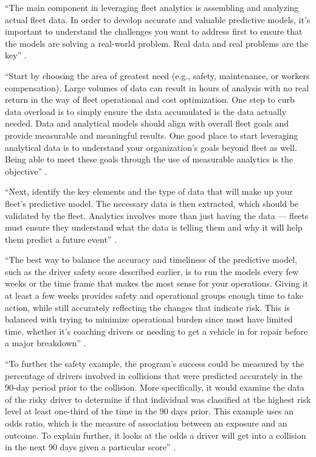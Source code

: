``The main component in leveraging fleet analytics is assembling and analyzing actual fleet data. In order to develop accurate and valuable predictive models, it’s important to understand the challenges you want to address first to ensure that the models are solving a real-world problem. Real data and real problems are the key'' \cite{Suizo2015decisions}.

``Start by choosing the area of greatest need (e.g., safety, maintenance, or workers compensation). Large volumes of data can result in hours of analysis with no real return in the way of fleet operational and cost optimization. One step to curb data overload is to simply ensure the data accumulated is the data actually needed. Data and analytical models should align with overall fleet goals and provide measurable and meaningful results. One good place to start leveraging analytical data is to understand your organization’s goals beyond fleet as well. Being able to meet these goals through the use of measurable analytics is the objective'' \cite{Suizo2015decisions}.

``Next, identify the key elements and the type of data that will make up your fleet’s predictive model. The necessary data is then extracted, which should be validated by the fleet. Analytics involves more than just having the data — fleets must ensure they understand what the data is telling them and why it will help them predict a future event'' \cite{Suizo2015decisions}.

``The best way to balance the accuracy and timeliness of the predictive model, such as the driver safety score described earlier, is to run the models every few weeks or the time frame that makes the most sense for your operations. Giving it at least a few weeks provides safety and operational groups enough time to take action, while still accurately reflecting the changes that indicate risk. This is balanced with trying to minimize operational burden since most have limited time, whether it’s coaching drivers or needing to get a vehicle in for repair before a major breakdown'' \cite{Suizo2015decisions}.

``To further the safety example, the program’s success could be measured by the percentage of drivers involved in collisions that were predicted accurately in the 90-day period prior to the collision. More specifically, it would examine the data of the risky driver to determine if that individual was classified at the highest risk level at least one-third of the time in the 90 days prior. This example uses an odds ratio, which is the measure of association between an exposure and an outcome. To explain further, it looks at the odds a driver will get into a collision in the next 90 days given a particular score'' \cite{Suizo2015decisions}.

